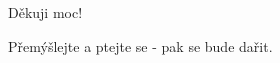 \documentclass{beamer}
\begin{document}
\begin{frame}{}
\begin{center}
\begin{Huge}
Děkuji moc!



Přemýšlejte a ptejte se - pak se bude dařit.
\end{Huge}

\end{center}
\end{frame}
\end{document}
